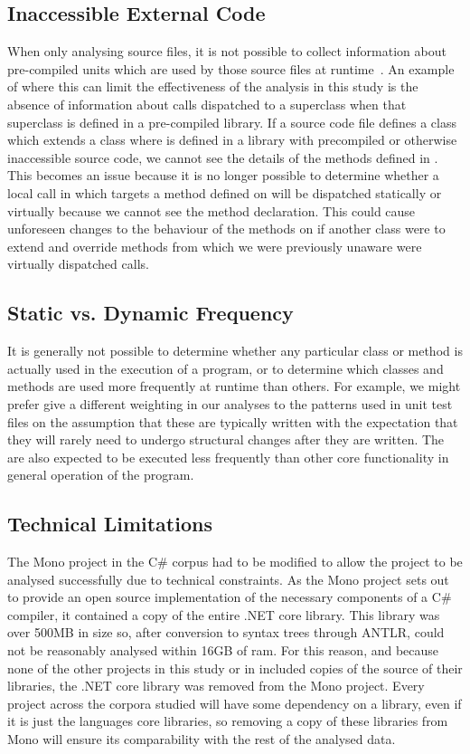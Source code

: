 \subsection{Inaccessible External Code}
\label{InaccessibleCode}
When only analysing source files, it is not possible to collect information about pre-compiled units which are used by those source files at runtime~\cite{StaticAnalysisLimits}. An example of where this can limit the effectiveness of the analysis in this study is the absence of information about calls dispatched to a superclass when that superclass is defined in a pre-compiled library. If a source code file defines a class  which extends a class  where  is defined in a library with precompiled or otherwise inaccessible source code, we cannot see the details of the methods defined in . This becomes an \textsl{}issue because it is no longer possible to determine whether a local call in  which targets a method defined on  will be dispatched statically or virtually because we cannot see the method declaration. This could cause unforeseen changes to the behaviour of the methods on  if another class  were to extend  and override methods from  which we were previously unaware were virtually dispatched calls.

\subsection{Static vs. Dynamic Frequency}
It is generally not possible to determine whether any particular class or method is actually used in the execution of a program, or to determine which classes and methods are used more frequently at runtime than others. For example, we might prefer give a different weighting in our analyses to the patterns used in unit test files on the assumption that these are typically written with the expectation that they will rarely need to undergo structural changes after they are written. The are also expected to be executed less frequently than other core functionality in general operation of the program.

\subsection{Technical Limitations}
The Mono project in the C\# corpus had to be modified to allow the project to be analysed successfully due to technical constraints. As the Mono project sets out to provide an open source implementation of the necessary components of a C\# compiler, it contained a copy of the entire .NET core library. This library was over 500MB in size so, after conversion to syntax trees through ANTLR, could not be reasonably analysed within 16GB of ram. For this reason, and because none of the other projects in this study or in \cite{QualitasCorpus} included copies of the source of their libraries, the .NET core library was removed from the Mono project. Every project across the corpora studied will have some dependency on a library, even if it is just the languages core libraries, so removing a copy of these libraries from Mono will ensure its comparability with the rest of the analysed data.

